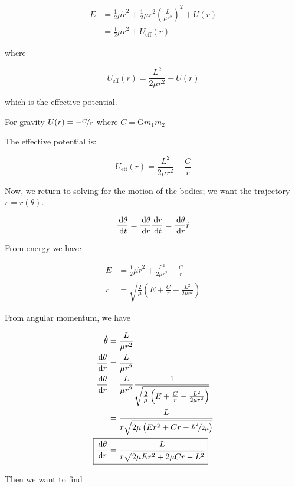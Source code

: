 \begin{align}
	E &= \frac{1}{2} \mu \dot r^2 + \frac{1}{2}\mu r^2 \left(\frac{L}{\mu r^2}\right)^2 + U(r)\\
	&= \frac{1}{2} \mu \dot r^2 + U_\mathrm{eff}(r)
\end{align}

where

\begin{equation}
	U_\mathrm{eff}(r) = \frac{L^2}{2 \mu r^2} + U(r)
\end{equation}

which is the effective potential.

For gravity $U(r) = - \nicefrac{C}{r}$ where $C = \mathrm{G} m_1 m_2$

The effective potential is:

\begin{equation}
	U_\mathrm{eff}(r) = \frac{L^2}{2 \mu r^2} - \frac{C}{r}
\end{equation}

Now, we return to solving for the motion of the bodies; we want the trajectory $r = r(\theta)$.

\begin{equation}
	\frac{\D \theta}{\D t} = \frac{\D \theta}{\D r} \frac{\D r}{\D t} = \frac{\D \theta}{\D r} \dot r
\end{equation}

From energy we have

\begin{align}
	E &= \frac{1}{2} \mu \dot r^2 + \frac{L^2}{2\mu r^2} - \frac{C}{r}\\
	\dot r &= \sqrt{\frac{2}{\mu} \left(E + \frac{C}{r} - \frac{L^2}{2\mu r^2}\right)}
\end{align}

From angular momentum, we have

\begin{align}
	\dot \theta &= \frac{L}{\mu r^2}\\
	\frac{\D \theta}{\D r} &= \frac{L}{\mu r^2}\\
	\frac{\D \theta}{\D r} &= \frac{L}{\mu r^2} \frac{1}{\sqrt{\frac{2}{\mu} \left(E + \frac{C}{r} - \frac{L^2}{2\mu r^2}\right)}}\\
	&= \frac{L}{r \sqrt{2 \mu \left(Er^2 + Cr - \nicefrac{L^2}{2\mu}\right)}}\\
	\Aboxed{\frac{\D \theta}{\D r} &= \frac{L}{r \sqrt{2 \mu E r^2 + 2 \mu Cr - L^2}}}
\end{align}

Then we want to find


